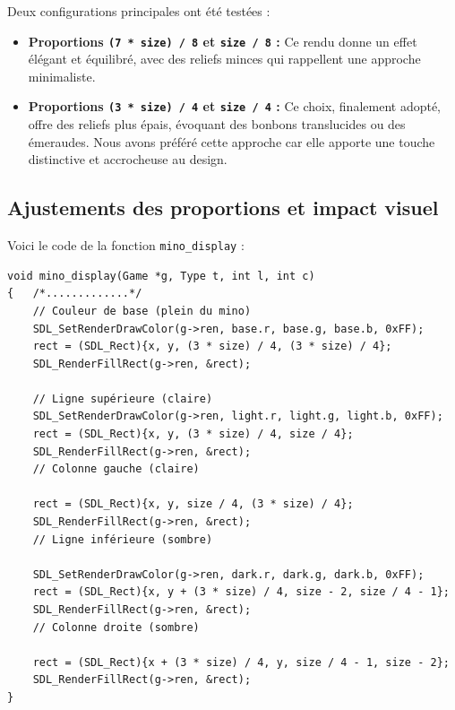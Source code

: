 \documentclass[12pt,a4paper]{report}
\begin{document}
Deux configurations principales ont été testées :
\begin{itemize}
\item \textbf{Proportions \texttt{(7 * size) / 8} et \texttt{size / 8} :} Ce rendu donne un effet élégant et équilibré, avec des reliefs minces qui rappellent une approche minimaliste.
\item \textbf{Proportions \texttt{(3 * size) / 4} et \texttt{size / 4} :} Ce choix, finalement adopté, offre des reliefs plus épais, évoquant des bonbons translucides ou des émeraudes. Nous avons préféré cette approche car elle apporte une touche distinctive et accrocheuse au design.
\end{itemize}

\subsection{Ajustements des proportions et impact visuel}

Voici le code de la fonction \texttt{mino\_display} :
\begin{lstlisting}
void mino_display(Game *g, Type t, int l, int c)
{   /*.............*/
    // Couleur de base (plein du mino)
    SDL_SetRenderDrawColor(g->ren, base.r, base.g, base.b, 0xFF);
    rect = (SDL_Rect){x, y, (3 * size) / 4, (3 * size) / 4};
    SDL_RenderFillRect(g->ren, &rect);
    
    // Ligne supérieure (claire)
    SDL_SetRenderDrawColor(g->ren, light.r, light.g, light.b, 0xFF);
    rect = (SDL_Rect){x, y, (3 * size) / 4, size / 4};
    SDL_RenderFillRect(g->ren, &rect);
    // Colonne gauche (claire)
    
    rect = (SDL_Rect){x, y, size / 4, (3 * size) / 4};
    SDL_RenderFillRect(g->ren, &rect);
    // Ligne inférieure (sombre)
    
    SDL_SetRenderDrawColor(g->ren, dark.r, dark.g, dark.b, 0xFF);
    rect = (SDL_Rect){x, y + (3 * size) / 4, size - 2, size / 4 - 1};
    SDL_RenderFillRect(g->ren, &rect);
    // Colonne droite (sombre)
    
    rect = (SDL_Rect){x + (3 * size) / 4, y, size / 4 - 1, size - 2};
    SDL_RenderFillRect(g->ren, &rect);
}
\end{lstlisting}
\end{document}
